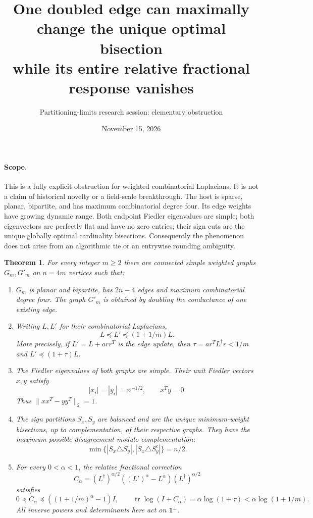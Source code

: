 \documentclass[11pt]{article}
\title{One doubled edge can maximally change the unique optimal bisection\\
while its entire relative fractional response vanishes}
\author{Partitioning-limits research session: elementary obstruction}
\date{November 15, 2026}
\newtheorem{theorem}{Theorem}
\newcommand{\one}{\boldsymbol 1}
\newcommand{\tr}{\operatorname{tr}}
\begin{document}
\maketitle

\paragraph{Scope.}
This is a fully explicit obstruction for weighted combinatorial Laplacians.
It is not a claim of historical novelty or a field-scale breakthrough.
The host is sparse, planar, bipartite, and has maximum combinatorial degree
four. Its edge weights have growing dynamic range. Both endpoint Fiedler
eigenvalues are simple; both eigenvectors are perfectly flat and have no
zero entries; their sign cuts are the unique globally optimal cardinality
bisections. Consequently the phenomenon does not arise from an algorithmic
tie or an entrywise rounding ambiguity.

\begin{theorem}\label{thm:main}
For every integer $m\ge2$ there are connected simple weighted graphs
$G_m,G'_m$ on $n=4m$ vertices such that:
\begin{enumerate}
\item $G_m$ is planar and bipartite, has $2n-4$ edges and maximum
combinatorial degree four. The graph $G'_m$ is obtained by doubling the
conductance of one existing edge.
\item Writing $L,L'$ for their combinatorial Laplacians,
\[
             L\preceq L'\preceq(1+1/m)L.
\]
More precisely, if $L'=L+a rr^T$ is the edge update, then
$\tau=a r^TL^\dagger r<1/m$ and
$L'\preceq(1+\tau)L$.
\item The Fiedler eigenvalues of both graphs are simple. Their unit
Fiedler vectors $x,y$ satisfy
\[
 |x_i|=|y_i|=n^{-1/2},\qquad x^Ty=0.
\]
Thus $\|xx^T-yy^T\|_2=1$.
\item The sign partitions $S_x,S_y$ are balanced and are the unique
minimum-weight bisections, up to complementation, of their respective
graphs. They have the maximum possible disagreement modulo complementation:
\[
 \min\{|S_x\triangle S_y|,|S_x\triangle S_y^c|\}=n/2.
\]
\item For every $0<\alpha<1$, the relative fractional correction
\[
 C_\alpha=(L^\dagger)^{\alpha/2}
                  ((L')^\alpha-L^\alpha)(L^\dagger)^{\alpha/2}
\]
satisfies
\[
 0\preceq C_\alpha\preceq ((1+1/m)^\alpha-1)I,
 \qquad
 \tr\log(I+C_\alpha)=\alpha\log(1+\tau)
                             <\alpha\log(1+1/m).
\]
All inverse powers and determinants here act on $\one^\perp$.
\end{enumerate}
\end{theorem}
\end{document}
